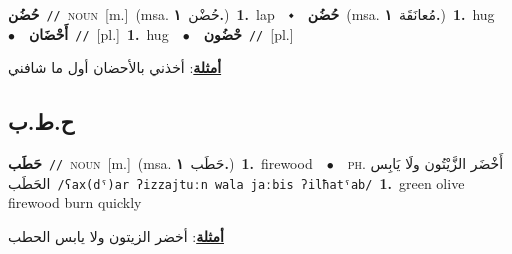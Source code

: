 \documentclass[10pt,a4paper,twoside]{article} %
\begin{document}
\begin{multicols}{2}
{\setlength\topsep{0pt}\textbf{\foreignlanguage{arabic}{حُضُن}}\ {\color{gray}\texttt{//}\color{black}}\ \textsc{noun}\ [m.]\ \color{gray}(msa. \foreignlanguage{arabic}{حُضْن}~\foreignlanguage{arabic}{\textbf{١.}})\color{black}\ \textbf{1.}~lap\ \ $\smblkdiamond$\ \ \setlength\topsep{0pt}\textbf{\foreignlanguage{arabic}{حُضُن}}\ \color{gray}(msa. \foreignlanguage{arabic}{مُعانَقَة}~\foreignlanguage{arabic}{\textbf{١.}})\color{black}\ \textbf{1.}~hug\ \ $\bullet$\ \ \setlength\topsep{0pt}\textbf{\foreignlanguage{arabic}{أَحْضَان}}\ {\color{gray}\texttt{//}\color{black}}\ [pl.]\ \textbf{1.}~hug\ \ $\bullet$\ \ \setlength\topsep{0pt}\textbf{\foreignlanguage{arabic}{حْضُون}}\ {\color{gray}\texttt{//}\color{black}}\ [pl.]\  \begin{flushright}\color{gray}\foreignlanguage{arabic}{\textbf{\underline{\foreignlanguage{arabic}{أمثلة}}}: أخذني بالأحضان أول ما شافني}\end{flushright}\color{black}} \vspace{2mm}

\vspace{-3mm}
\subsection*{\color{blue}\foreignlanguage{arabic}{ح.ط.ب}\color{blue}{}} 

{\setlength\topsep{0pt}\textbf{\foreignlanguage{arabic}{حَطَب}}\ {\color{gray}\texttt{//}\color{black}}\ \textsc{noun}\ [m.]\ \color{gray}(msa. \foreignlanguage{arabic}{حَطَب}~\foreignlanguage{arabic}{\textbf{١.}})\color{black}\ \textbf{1.}~firewood\ \ $\bullet$\ \ \textsc{ph.} \color{gray} \foreignlanguage{arabic}{أَخْضَر الزَّيْتُون ولَا يَابِس الحَطَب}\color{black}\ {\color{gray}\texttt{/{\sffamily ʕax(dˤ)ar ʔizzajtuːn wala jaːbis ʔilħatˤab}/}\color{black}}\ \textbf{1.}~green olive firewood burn quickly\  \begin{flushright}\color{gray}\foreignlanguage{arabic}{\textbf{\underline{\foreignlanguage{arabic}{أمثلة}}}: أخضر الزيتون ولا يابس الحطب}\end{flushright}\color{black}} \vspace{2mm}


\end{multicols}
\end{document}
